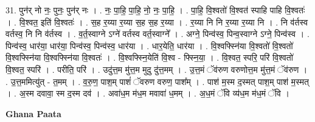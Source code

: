 \documentclass[17pt]{extarticle}
\begin{document}
31. पुन॑र् नो नः॒ पुनः॒ पुन॑र् नः । . नः॒ पा॒हि॒ पा॒हि॒ नो॒ नः॒ पा॒हि॒ । . पा॒हि॒ वि॒श्वतो॑ वि॒श्वत॑ स्पाहि पाहि वि॒श्वतः॑ । . वि॒श्वत॒ इति॑ वि॒श्वतः॑ । . स॒ह र॒य्या र॒य्या स॒ह स॒ह र॒य्या । . र॒य्या नि नि र॒य्या र॒य्या नि । . नि व॑र्तस्व वर्तस्व॒ नि नि व॑र्तस्व । . व॒र्त॒स्वाग्ने ऽग्ने॑ वर्तस्व वर्त॒स्वाग्ने᳚ । . अग्ने॒ पिन्व॑स्व॒ पिन्व॒स्वाग्ने ऽग्ने॒ पिन्व॑स्व । . पिन्व॑स्व॒ धार॑या॒ धार॑या॒ पिन्व॑स्व॒ पिन्व॑स्व॒ धार॑या । . धार॒येति॒ धार॑या । . वि॒श्वफ्स्नि॑या वि॒श्वतो॑ वि॒श्वतो॑ वि॒श्वफ्स्नि॑या वि॒श्वफ्स्नि॑या वि॒श्वतः॑ । . वि॒श्वफ्स्नि॒येति॑ वि॒श्व - फ्स्नि॒या॒ । . वि॒श्वत॒ स्परि॒ परि॑ वि॒श्वतो॑ वि॒श्वत॒ स्परि॑ । . परीति॒ परि॑ । . उदु॑त्त॒म मु॑त्त॒म मुदु दु॑त्त॒मम् । . उ॒त्त॒मं ॅव॑रुण वरुणोत्त॒म मु॑त्त॒मं ॅव॑रुण । . उ॒त्त॒ममित्यु॑त् - त॒मम् । . व॒रु॒ण॒ पाश॒म् पाशं॑ ॅवरुण वरुण॒ पाश᳚म् । . पाश॑ म॒स्म द॒स्मत् पाश॒म् पाश॑ म॒स्मत् । . अ॒स्म दवावा॒ स्म द॒स्म दव॑ । . अवा॑ध॒म म॑ध॒म मवावा॑ ध॒मम् । . अ॒ध॒मं ॅवि व्य॑ध॒म म॑ध॒मं ॅवि । \newline

\textbf{Ghana Paata } \newline
\end{document}
